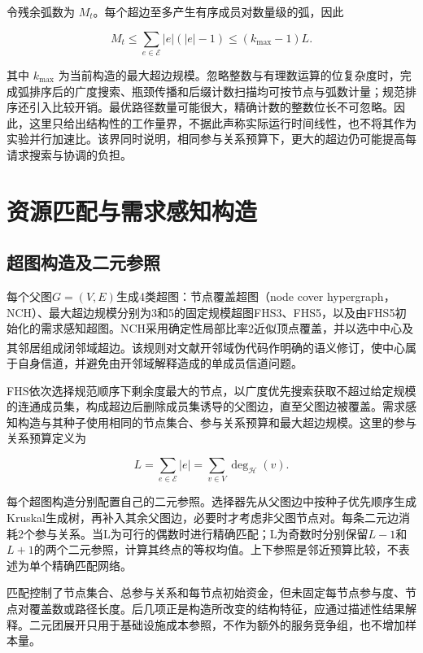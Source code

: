 \documentclass[UTF8,a4paper,twocolumn,fontset=none,zihao=5]{ctexart}
\newcommand{\upcite}[1]{\textsuperscript{\cite{#1}}}
\begin{document}
令残余弧数为 $M_t$。每个超边至多产生有序成员对数量级的弧，因此



\begin{equation}
M_t\leq\sum_{e\in\mathcal E}|e|(|e|-1)\leq(k_{\max}-1)L.
\label{eq:7}\end{equation}


其中 $k_{\max}$ 为当前构造的最大超边规模。忽略整数与有理数运算的位复杂度时，完成弧排序后的广度搜索、瓶颈传播和后缀计数扫描均可按节点与弧数计量；规范排序还引入比较开销。最优路径数量可能很大，精确计数的整数位长不可忽略。因此，这里只给出结构性的工作量界，不据此声称实际运行时间线性，也不将其作为实验并行加速比。该界同时说明，相同参与关系预算下，更大的超边仍可能提高每请求搜索与协调的负担。


\section{资源匹配与需求感知构造}

\subsection{超图构造及二元参照}

每个父图$G=(V,E)$生成4类超图：节点覆盖超图（node cover hypergraph，NCH）、最大超边规模分别为3和5的固定规模超图FHS3、FHS5，以及由FHS5初始化的需求感知超图。NCH采用确定性局部比率2近似顶点覆盖，并以选中中心及其邻居组成闭邻域超边。该规则对文献\upcite{r10}开邻域伪代码作明确的语义修订，使中心属于自身信道，并避免由开邻域解释造成的单成员信道问题。


FHS依次选择规范顺序下剩余度最大的节点，以广度优先搜索获取不超过给定规模的连通成员集，构成超边后删除成员集诱导的父图边，直至父图边被覆盖。需求感知构造与其种子使用相同的节点集合、参与关系预算和最大超边规模。这里的参与关系预算定义为



\begin{equation}
L=\sum_{e\in\mathcal E}|e|=\sum_{v\in V}\deg_{\mathcal H}(v).
\label{eq:8}\end{equation}


每个超图构造分别配置自己的二元参照。选择器先从父图边中按种子优先顺序生成Kruskal生成树，再补入其余父图边，必要时才考虑非父图节点对。每条二元边消耗2个参与关系。当L为可行的偶数时进行精确匹配；L为奇数时分别保留$L-1$和$L+1$的两个二元参照，计算其终点的等权均值。上下参照是邻近预算比较，不表述为单个精确匹配网络。


匹配控制了节点集合、总参与关系和每节点初始资金，但未固定每节点参与度、节点对覆盖数或路径长度。后几项正是构造所改变的结构特征，应通过描述性结果解释。二元团展开只用于基础设施成本参照，不作为额外的服务竞争组，也不增加样本量。
\end{document}

